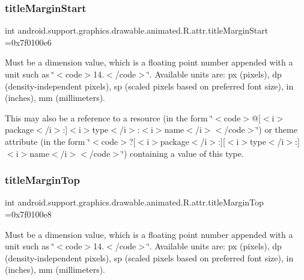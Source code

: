 \subsubsection{\texorpdfstring{title\+Margin\+Start}{titleMarginStart}}
{\footnotesize\ttfamily int android.\+support.\+graphics.\+drawable.\+animated.\+R.\+attr.\+title\+Margin\+Start =0x7f0100e6\hspace{0.3cm}{\ttfamily [static]}}

Must be a dimension value, which is a floating point number appended with a unit such as \char`\"{}$<$code$>$14.\+5sp$<$/code$>$\char`\"{}. Available units are\+: px (pixels), dp (density-\/independent pixels), sp (scaled pixels based on preferred font size), in (inches), mm (millimeters). 

This may also be a reference to a resource (in the form \char`\"{}$<$code$>$@\mbox{[}$<$i$>$package$<$/i$>$\+:\mbox{]}$<$i$>$type$<$/i$>$\+:$<$i$>$name$<$/i$>$$<$/code$>$\char`\"{}) or theme attribute (in the form \char`\"{}$<$code$>$?\mbox{[}$<$i$>$package$<$/i$>$\+:\mbox{]}\mbox{[}$<$i$>$type$<$/i$>$\+:\mbox{]}$<$i$>$name$<$/i$>$$<$/code$>$\char`\"{}) containing a value of this type. \mbox{\label{classandroid_1_1support_1_1graphics_1_1drawable_1_1animated_1_1R_1_1attr_a67a7779546f0beca006f340866643b21}} 
\subsubsection{\texorpdfstring{title\+Margin\+Top}{titleMarginTop}}
{\footnotesize\ttfamily int android.\+support.\+graphics.\+drawable.\+animated.\+R.\+attr.\+title\+Margin\+Top =0x7f0100e8\hspace{0.3cm}{\ttfamily [static]}}

Must be a dimension value, which is a floating point number appended with a unit such as \char`\"{}$<$code$>$14.\+5sp$<$/code$>$\char`\"{}. Available units are\+: px (pixels), dp (density-\/independent pixels), sp (scaled pixels based on preferred font size), in (inches), mm (millimeters). 

